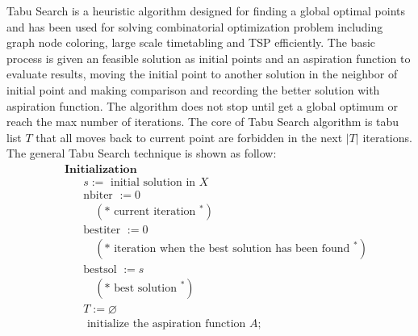 \documentclass{article}
\begin{document}
Tabu Search is a heuristic algorithm designed for finding a global optimal points and has been used for solving combinatorial optimization problem including graph node coloring, large scale timetabling and TSP efficiently. The basic process is given an feasible solution as initial points and an aspiration function to evaluate results, moving the initial point to another solution in the neighbor of initial point and making comparison and recording the better solution with aspiration function. The algorithm does not stop until get a global optimum or reach the max number of iterations. The core of Tabu Search algorithm is tabu list $T$ that all moves back to current point are forbidden in the next $|T|$ iterations. The general Tabu Search technique is shown as follow:
\begin{align*}
	 & \textbf { Initialization }                                                                                                                   \\
	 & \qquad s:=\text { initial solution in } X                                                                                                    \\
	 & \qquad \text {nbiter }:=0                                                                                                                    \\
	 & \qquad \quad\left(* \text { current iteration }^{*}\right)                                                                                   \\
	 & \qquad \text {bestiter }:=0                                                                                                                  \\
	 & \qquad\quad\left(* \text { iteration when the best solution has been found }^{*}\right)                                                      \\
	 & \qquad \text {bestsol }:=s                                                                                                                   \\
	 & \qquad \quad\left(* \text { best solution }^{*}\right)                                                                                       \\
	 & \qquad T:=\varnothing                                                                                                                        \\
	 & \qquad \text { initialize the aspiration function } A \text {; }                                                                             \\

\end{align*}
\end{document}
